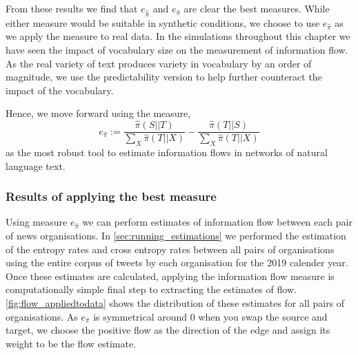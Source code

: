 From these results we find that $e_{\hat{h}}$ and $e_{\hat{\pi}}$ are clear the best measures. While either measure would be suitable in synthetic conditions, we choose to use $e_{\hat{\pi}}$ as we apply the measure to real data. In the simulations throughout this chapter we have seen the impact of vocabulary size on the measurement of information flow. As the real variety of text produces variety in vocabulary by an order of magnitude, we use the predictability version to help further counteract the impact of the vocabulary. 

Hence, we move forward using the measure,
\begin{equation} 
e_{\hat{\pi}} := \frac{\hat{\pi}(S||T)}{\sum_X \hat{\pi}(T||X)} - \frac{\hat{\pi}(T||S)}{\sum_X \hat{\pi}(T||X)}
\end{equation}
as the most robust tool to estimate information flows in networks of natural language text. 

\subsubsection{Results of applying the best measure}

Using measure $e_{\hat{\pi}}$ we can perform estimates of information flow between each pair of news organisations. In \autoref{sec:running_estimations} we performed the estimation of the entropy rates and cross entropy rates between all pairs of organisations using the entire corpus of tweets by each organisation for the 2019 calender year. Once these estimates are calculated, applying the information flow measure is computationally simple final step to extracting the estimates of flow. \autoref{fig:flow_appliedtodata} shows the distribution of these estimates for all pairs of organisations. As $e_{\hat{\pi}}$ is symmetrical around 0 when you swap the source and target, we choose the positive flow as the direction of the edge and assign its weight to be the flow estimate.


